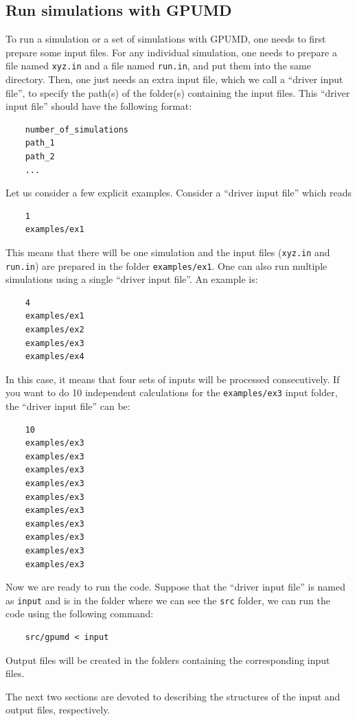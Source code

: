 \documentclass[12pt,a4paper]{report}
\begin{document}
\subsection{Run simulations with GPUMD}

To run a simulation or a set of simulations with GPUMD, one needs to first prepare some input files. For any individual simulation, one needs to prepare a file named \verb"xyz.in" and a file named \verb"run.in", and put them into the same directory. Then, one just needs an extra input file, which we call a ``driver input file'', to specify the path(s) of the folder(s) containing the input files. This ``driver input file'' should have the following format:
\begin{verbatim}
    number_of_simulations
    path_1
    path_2
    ...
\end{verbatim}


Let us consider a few explicit examples. Consider a ``driver input file'' which reads
\begin{verbatim}
    1
    examples/ex1
\end{verbatim}
This means that there will be one simulation and the input files (\verb"xyz.in" and \verb"run.in") are prepared in the folder \verb"examples/ex1". One can also run multiple simulations using a single ``driver input file''. An example is:
\begin{verbatim}
    4
    examples/ex1
    examples/ex2
    examples/ex3
    examples/ex4
\end{verbatim}
In this case, it means that four sets of inputs will be processed consecutively. If you want to do 10 independent calculations for the \verb"examples/ex3" input folder, the ``driver input file'' can be:
\begin{verbatim}
    10
    examples/ex3
    examples/ex3
    examples/ex3
    examples/ex3
    examples/ex3
    examples/ex3
    examples/ex3
    examples/ex3
    examples/ex3
    examples/ex3
\end{verbatim}

Now we are ready to run the code. Suppose that the ``driver input file'' is named as \verb"input" and is in the folder where we can see the \verb"src" folder, we can run the code using the following command:
\begin{verbatim}
    src/gpumd < input
\end{verbatim}
Output files will be created in the folders containing the corresponding input files.

The next two sections are devoted to describing the structures of the input and output files, respectively.
\end{document}
